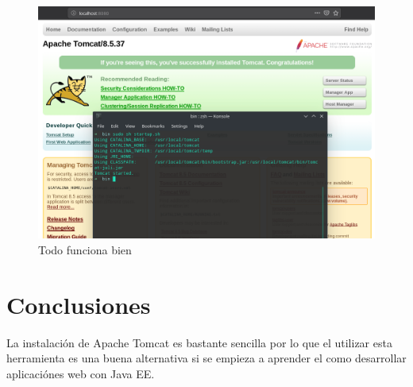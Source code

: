 \documentclass[a4paper,12pt]{article}
\begin{document}
\begin{figure}[H]
\begin{center}
 \includegraphics[width=12cm]{final.png}
 \caption{Todo funciona bien}
 \label{fig:final}
\end{center}
\end{figure}

\section{Conclusiones}
La instalación de Apache Tomcat es bastante sencilla por lo que el utilizar 
esta herramienta es una buena alternativa si se empieza a aprender el como 
desarrollar aplicaciónes web con Java EE.
\end{document}
